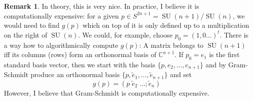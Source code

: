 \documentclass[a4paper,11pt]{article}
\theoremstyle{definition}
\newtheorem{remark}{Remark}
\newcommand{\CC}{\mathbb{C}}
\DeclareMathOperator{\SU}{SU}
\begin{document}
\begin{remark}
  In theory, this is very nice. 
  In practice, I believe it is computationally expensive: for a given $p \in S^{2n +1} = \SU(n+1)/\SU(n)$, we would need to find $g(p)$ which on top of it is only defined up to a multiplication on the right of $\SU(n)$.
  We could, for example, choose $p_0 = (1,0\dots)^t$.
  There is a way how to algorithmically compute $g(p)$: A matrix belongs to $\SU(n+1)$ iff its columns (rows) form an orthonormal basis of $\CC^{n+1}$.
  If $p_0 = e_1$ is the first standard basis vector, then we start with the basis $\{ p, e_2,\dots, e_{n+1} \}$ and by Gram-Schmidt produce an orthonormal basis $\{ p, \tilde e_1, \dots, \tilde e_{n+1} \}$ and set
  \begin{equation}
    g(p) = (p\; \tilde e_2\; \dots; \tilde e_n)
  \end{equation}
  However, I believe that Gram-Schmidt is computationally expensive.


\end{remark}
\end{document}
